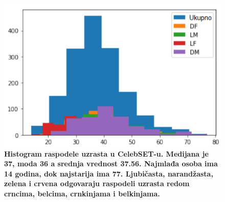 \documentclass[11pt, a4paper]{article}
\begin{document}
\begin{figure}[h!]
	\centerline{\includegraphics[width=0.4\linewidth]{hist.PNG}}
	\caption{\textbf{Histogram raspodele uzrasta u CelebSET-u. Medijana je 37, moda 36 a srednja vrednost 37.56. Najmlađa osoba ima 14 godina, dok najstarija ima 77. \textcolor{cc-purple}{Ljubičasta}, \textcolor{cc-orange}{narandžasta}, \textcolor{cc-green}{zelena} i \textcolor{cc-red}{crvena} odgovaraju raspodeli uzrasta redom crncima, belcima, crnkinjama i belkinjama.}}
	\label{fig:hist}
\end{figure}
\end{document}
